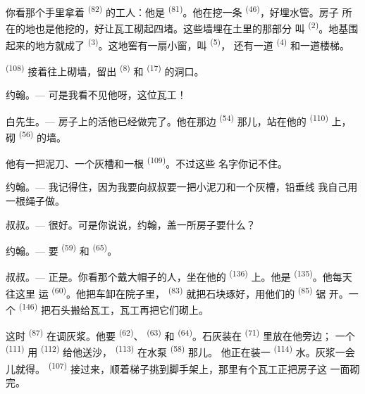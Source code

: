 你看那个手里拿着 \textsuperscript{(82)} 的工人：他是
\textsuperscript{(81)}。他在挖一条 \textsuperscript{(46)}，好埋水管。房子
所在的地也是他挖的，好让瓦工砌起四堵。这些墙埋在土里的那部分
叫 \textsuperscript{(2)}。地基围起来的地方就成了
\textsuperscript{(3)}。这地窖有一扇小窗，叫 \textsuperscript{(5)}，
还有一道 \textsuperscript{(4)} 和一道楼梯。

 \textsuperscript{(108)} 接着往上砌墙，留出
\textsuperscript{(8)} 和 \textsuperscript{(17)} 的洞口。

\textsc{约翰}。--- 可是我看不见他呀，这位瓦工！

\textsc{白先生}。--- 房子上的活他已经做完了。他在那边
\textsuperscript{(54)} 那儿，站在他的 \textsuperscript{(110)} 上，
砌 \textsuperscript{(56)} 的墙。

他有一把泥刀、一个灰槽和一根 \textsuperscript{(109)}。不过这些
名字你记不住。

\textsc{约翰}。--- 我记得住，因为我要向叔叔要一把小泥刀和一个灰槽，铅垂线
我自己用一根绳子做。

\VUsaut{3.0mm}
\VUsaut{3.0mm}

\textsc{叔叔}。--- 很好。可是你说说，约翰，盖一所房子要什么？

\textsc{约翰}。--- 要 \textsuperscript{(59)} 和
\textsuperscript{(65)}。

\textsc{叔叔}。--- 正是。你看那个戴大帽子的人，坐在他的
\textsuperscript{(136)} 上。他是 \textsuperscript{(135)}。他每天往这里
运 \textsuperscript{(60)}。他把车卸在院子里，
\textsuperscript{(83)} 就把石块琢好，用他们的 \textsuperscript{(85)} 锯
开。一个 \textsuperscript{(146)} 把石头搬给瓦工，瓦工再把它们砌上。

这时 \textsuperscript{(87)} 在调灰浆。他要
\textsuperscript{(62)}、 \textsuperscript{(63)} 和
\textsuperscript{(64)}。石灰装在 \textsuperscript{(71)} 里放在他旁边；
一个 \textsuperscript{(111)} 用 \textsuperscript{(112)}
给他送沙， \textsuperscript{(113)} 在水泵 \textsuperscript{(58)} 那儿。
他正在装一 \textsuperscript{(114)} 水。灰浆一会儿就得。
\textsuperscript{(107)} 接过来，顺着梯子挑到脚手架上，那里有个瓦工正把房子这
一面砌完。

